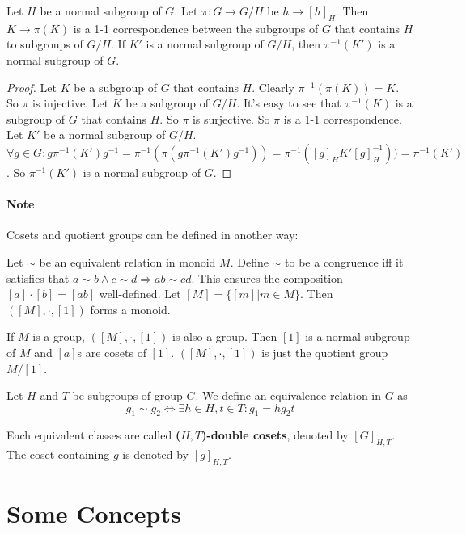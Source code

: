 \documentclass[12pt]{book}
\begin{document}
	\begin{theorem}
		Let $H$ be a normal subgroup of $G$. Let $\pi:G\rightarrow G/H$ be $h\rightarrow [h]_H$. Then $K\rightarrow \pi(K)$ is a 1-1 correspondence between the subgroups of $G$ that contains $H$ to subgroups of $G/H$. If $K'$ is a normal subgroup of $G/H$, then $\pi^{-1}(K')$ is a normal subgroup of $G$.
	\end{theorem}
	\begin{proof}
		Let $K$ be a subgroup of $G$ that contains $H$. Clearly $\pi^{-1}(\pi(K))=K$. So $\pi$ is injective. Let $K$ be a subgroup of $G/H$. It's easy to see that $\pi^{-1}(K)$ is a subgroup of $G$ that contains $H$. So $\pi$ is surjective. So $\pi$ is a 1-1 correspondence. Let $K'$ be a normal subgroup of $G/H$. $\forall g\in G: g\pi^{-1}(K')g^{-1}=\pi^{-1}(\pi(g\pi^{-1}(K')g^{-1}))=\pi^{-1}([g]_HK'[g]_H^{-1}))=\pi^{-1}(K')$. So $\pi^{-1}(K')$ is a normal subgroup of $G$.
	\end{proof}
	
	\paragraph{Note}
		Cosets and quotient groups can be defined in another way:
		
		Let $\sim$ be an equivalent relation in monoid $M$. Define $\sim$ to be a congruence iff it satisfies that $a\sim b \wedge c \sim d \Rightarrow ab\sim cd$. This ensures the composition $[a]\cdot[b]=[ab]$ well-defined. Let $[M]=\{[m]|m\in M\}$. Then $([M],\cdot,[1])$ forms a monoid.
		
		If $M$ is a group, $([M],\cdot,[1])$ is also a group. Then $[1]$ is a normal subgroup of $M$ and $[a]$s are cosets of $[1]$. $([M],\cdot,[1])$ is just the quotient group $M/[1]$.
		
\begin{definition}
	Let $H$ and $T$ be  subgroups of group $G$. We define an equivalence relation in $G$ as
	\begin{equation}
		g_1\sim g_2 \iff \exists h\in H, t\in T: g_1=hg_2 t
	\end{equation}
	
	Each equivalent classes are called \textbf{ ($H,T$)-double cosets}, denoted by $[G]_{H,T}$. The coset containing $g$ is denoted by $[g]_{H,T}$.
\end{definition}
	\section{Some Concepts}
	
\end{document}
